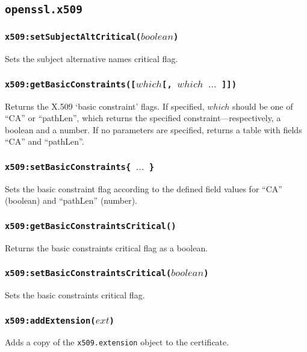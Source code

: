 \documentclass[11pt, oneside]{memoir}
\newcommand*{\fn}[1]{\texttt{#1}\xspace}
\newcommand*{\module}[1]{\texttt{#1}\xspace}
\newcounter{toccols}
\newenvironment{Module}[1]{
	\subsection{\texttt{#1}}
	\addtocontents{toc}{
		\protect\begin{multicols}{\value{toccols}}
	}
}{
	\addtocontents{toc}{\protect\end{multicols}}
}
\begin{document}
\begin{Module}{openssl.x509}
\subsubsection[\fn{x509:setSubjectAltCritical}]{\fn{x509:setSubjectAltCritical($boolean$)}}

Sets the subject alternative names critical flag.

\subsubsection[\fn{x509:getBasicConstraints}]{\fn{x509:getBasicConstraints([$which$[, $which$ $\ldots$ ]])}}

Returns the X.509 `basic constraint' flags. If specified, $which$ should be one of ``CA'' or ``pathLen'', which returns the specified constraint---respectively, a boolean and a number.  If no parameters are specified, returns a table with fields ``CA'' and ``pathLen''.

\subsubsection[\fn{x509:setBasicConstraints}]{\fn{x509:setBasicConstraints\{ $\ldots$ \}}}

Sets the basic constraint flag according to the defined field values for ``CA'' (boolean) and ``pathLen'' (number).

\subsubsection[\fn{x509:getBasicConstraintsCritical}]{\fn{x509:getBasicConstraintsCritical()}}

Returns the basic constraints critical flag as a boolean.

\subsubsection[\fn{x509:setBasicConstraintsCritical}]{\fn{x509:setBasicConstraintsCritical($boolean$)}}

Sets the basic constraints critical flag.

\subsubsection[\fn{x509:addExtension}]{\fn{x509:addExtension($ext$)}}

Adds a copy of the \module{x509.extension} object to the certificate.


\end{Module}
\end{document}
